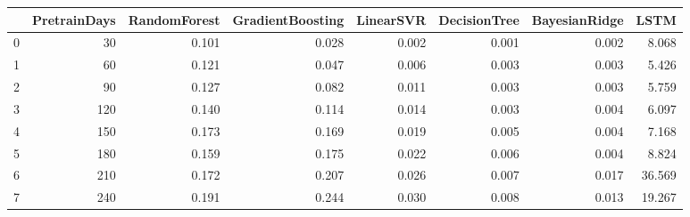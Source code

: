 \begin{tabular}{lrrrrrrr}
\toprule
{} &  PretrainDays &  RandomForest &  GradientBoosting &  LinearSVR &  DecisionTree &  BayesianRidge &   LSTM \\
\midrule
0 &            30 &         0.101 &             0.028 &      0.002 &         0.001 &          0.002 &  8.068 \\
1 &            60 &         0.121 &             0.047 &      0.006 &         0.003 &          0.003 &  5.426 \\
2 &            90 &         0.127 &             0.082 &      0.011 &         0.003 &          0.003 &  5.759 \\
3 &           120 &         0.140 &             0.114 &      0.014 &         0.003 &          0.004 &  6.097 \\
4 &           150 &         0.173 &             0.169 &      0.019 &         0.005 &          0.004 &  7.168 \\
5 &           180 &         0.159 &             0.175 &      0.022 &         0.006 &          0.004 &  8.824 \\
6 &           210 &         0.172 &             0.207 &      0.026 &         0.007 &          0.017 & 36.569 \\
7 &           240 &         0.191 &             0.244 &      0.030 &         0.008 &          0.013 & 19.267 \\
\bottomrule
\end{tabular}
